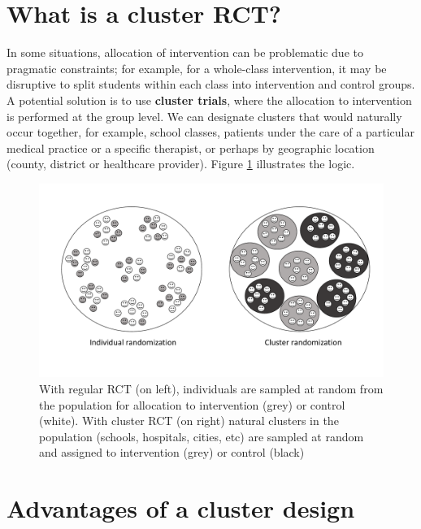 \documentclass{krantz}
\begin{document}
\hypertarget{what-is-a-cluster-rct}{%
\section{What is a cluster RCT?}\label{what-is-a-cluster-rct}}

In some situations, allocation of intervention can be problematic due to pragmatic constraints; for example, for a whole-class intervention, it may be disruptive to split students within each class into intervention and control groups. A potential solution is to use \textbf{cluster trials}, where the allocation to intervention is performed at the group level. We can designate clusters that would naturally occur together, for example, school classes, patients under the care of a particular medical practice or a specific therapist, or perhaps by geographic location (county, district or healthcare provider). Figure \ref{fig:cluster-diag} illustrates the logic.\\

\begin{center}
\begin{figure}
\includegraphics[width=0.8\linewidth]{images_bw/clusterdemo} \caption{With regular RCT (on left), individuals are sampled at random from the population for allocation to intervention (grey) or control (white).  With cluster RCT (on right) natural clusters in the population (schools, hospitals, cities, etc) are sampled at random and assigned to intervention (grey) or control (black)}\label{fig:cluster-diag}
\end{figure}
\end{center}

\hypertarget{advantages-of-a-cluster-design}{%
\section{Advantages of a cluster design}\label{advantages-of-a-cluster-design}}
\end{document}
